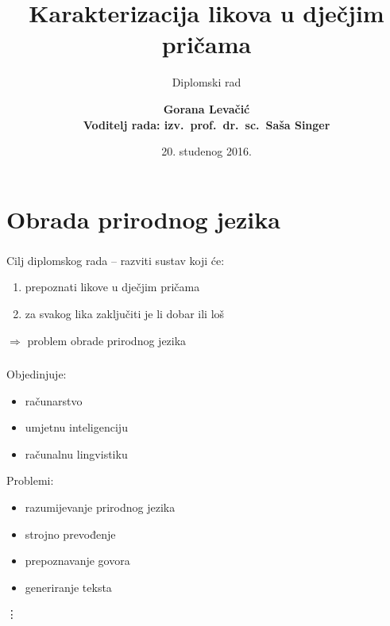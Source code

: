 \documentclass[t, xcolor={usenames,dvipsnames,svgnames,table}]{beamer}
\title[Karakterizacija likova]{Karakterizacija likova u dječjim pričama}
\subtitle{Diplomski rad}
\institute{Prirodoslovno matematički fakultet - Matematički odsjek}
\author[Gorana Levačić]{\textbf {Gorana Levačić \\ \footnotesize Voditelj rada: izv.~prof.~dr.~sc.~Saša Singer}}
\date{20. studenog 2016.}
\begin{document}
	

\begin{frame}
	\titlepage
\end{frame}

\begin{frame}
	\tableofcontents
\end{frame}

\section{Obrada prirodnog jezika}

	\begin{frame}
		\sectionpage
	\end{frame}

	\begin{frame}
		\frametitle{\secname}
		
		Cilj diplomskog rada -- razviti sustav koji će:
		\begin{enumerate}
			\item 	prepoznati likove u dječjim pričama
			\item 	za svakog lika zaključiti je li dobar ili loš
		\end{enumerate}
		
		\medskip
		
		$\Rightarrow$ problem obrade prirodnog jezika
	
	\end{frame}
		
	\begin{frame}
		\frametitle{\secname}
		
		Objedinjuje:	
		\begin{itemize}
			\item	računarstvo
			\item 	umjetnu inteligenciju 
			\item 	računalnu lingvistiku
		\end{itemize}
		
		\medskip
		
		Problemi:
		\begin{itemize}
			\item	razumijevanje prirodnog jezika
			\item 	strojno prevođenje
			\item 	prepoznavanje govora
			\item 	generiranje teksta
		\end{itemize}
		
		\hspace{0.8em} \vdots
	
	\end{frame}
	
\end{document}
